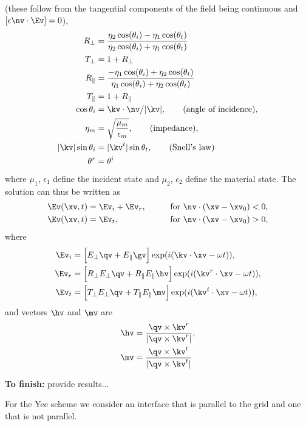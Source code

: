 \documentclass[11pt]{article}
\begin{document}
(these follow from the tangential components of the field being continuous and $[ \epsilon \nv\cdot\Ev]=0$), 
\begin{align}
   R_\perp &= { \eta_2\cos(\theta_i) - \eta_1 \cos(\theta_t) \over \eta_2\cos(\theta_i) + \eta_1 \cos(\theta_t) } \\
   T_\perp &= 1 + R_\perp\\
   R_\parallel &= { -\eta_1\cos(\theta_i) + \eta_2 \cos(\theta_t) \over \eta_1\cos(\theta_i) + \eta_2 \cos(\theta_t) } \\
   T_\parallel &= 1 + R_\parallel\\
   \cos\theta_i &= \kv\cdot\nv/\vert \kv \vert, \qquad\text{(angle of incidence)}, \\
   \eta_m & = \sqrt{\frac{\mu_m}{\epsilon_m}} , \qquad\text{(impedance)}, \\
   \vert \kv \vert \sin\theta_i &= \vert \kv^t \vert \sin\theta_t, \qquad\text{(Snell's law)} \\
   \theta^r &= \theta^i 
\end{align}
where $\mu_1$, $\epsilon_1$ define the incident state and $\mu_2$, $\epsilon_2$ define the material state.
The solution can thus be written as
\begin{alignat}{3}
   \Ev(\xv,t) &= \Ev_i  + \Ev_r , \qquad&&\text{for $\nv\cdot(\xv-\xv_0) < 0$} , \\
   \Ev(\xv,t) &= \Ev_t          , \qquad&&\text{for $\nv\cdot(\xv-\xv_0) > 0$} , 
\end{alignat}
where
\begin{align}
   \Ev_i &= \Big[ E_\perp \qv + E_\parallel \gv \Big] \exp(i(\kv\cdot\xv - \omega t)), \\
   \Ev_r &= \Big[ R_\perp E_\perp \qv + R_\parallel E_\parallel \hv \Big] \exp(i(\kv^r\cdot\xv - \omega t)), \\
   \Ev_t &= \Big[ T_\perp E_\perp \qv + T_\parallel E_\parallel \mv \Big] \exp(i(\kv^t\cdot\xv - \omega t)), 
\end{align}
and vectors $\hv$ and $\mv$ are 
\begin{align}
  \hv &= \frac{\qv \times \kv^r}{\vert \qv \times \kv^r \vert},\\
  \mv &= \frac{\qv \times \kv^t}{\vert \qv \times \kv^t \vert} 
\end{align}



{\bf To finish: } provide results...

For the Yee scheme we consider an interface that is parallel to the grid and one that is not parallel. 
\end{document}
